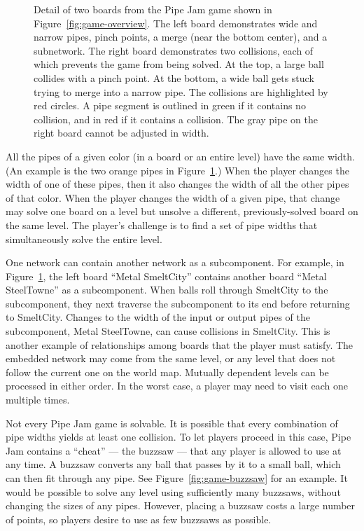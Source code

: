 \documentclass{sig-alternate}
\newcommand{\figref}[1]{Figure~\ref{#1}}
\let\Description =\description
\def\Nospacing{\itemsep=0pt\topsep=0pt\partopsep=0pt\parskip=0pt\parsep=0pt}
\renewenvironment{description}{\Description\Nospacing}{\endlist}
\begin{document}
\begin{description}
\begin{figure}
\caption{
  Detail of two boards from the Pipe Jam game shown in
  \figref{fig:game-overview}.  The left board demonstrates wide and
  narrow pipes, pinch points, a merge (near the bottom center), and a
  subnetwork.  The right board demonstrates two collisions, each of which
  prevents the game from being solved.  At the top, a large ball
  collides with a pinch point.  At the bottom, a wide ball gets stuck
  trying to merge into a narrow pipe.  The collisions are highlighted by
  red circles.  A pipe segment is outlined in green if it contains  no
  collision, and in red if it contains a collision.
  The gray pipe on the right board cannot be adjusted in width.
}
\label{fig:game-detail}
\end{figure}


\item[Linked pipes]
  All the pipes of a given color (in a board or an entire level) have the
  same width.
  (An example is the two orange pipes in \figref{fig:game-detail}.)
  When the player changes the width of one of these pipes,
  then it also changes the width of all the other pipes of that color.
  When the player changes the width of a given pipe, that change may solve
  one board on a level but unsolve a different, previously-solved board on
  the same level.  The player's challenge is to find a set of pipe widths
  that simultaneously solve the entire level.

\item[Embedded networks]
  One network can contain another network as a subcomponent.  For example,
  in \figref{fig:game-detail}, the left board ``Metal SmeltCity''
  contains another board ``Metal SteelTowne'' as a subcomponent.  When
  balls roll through SmeltCity to the subcomponent, they next traverse the
  subcomponent to its end before returning to SmeltCity.  Changes to the
  width of the input or output pipes of the subcomponent, Metal SteelTowne,
  can cause collisions in SmeltCity.  This is another example of
  relationships among boards that the player must satisfy.
  The embedded network may come from the same level, or any level that
  does not follow the current one on the world map.  Mutually dependent
  levels can be processed in either order.  In the worst case, a player
  may need to visit each one multiple times.

\item[Buzzsaws:  Exceptions to the laws of physics]
  Not every Pipe Jam game is solvable.  It is possible that every
  combination of pipe widths yields at least one collision.  To let players
  proceed in this case, Pipe Jam contains a ``cheat'' --- the buzzsaw ---
  that any player is allowed to use at any time.  A buzzsaw converts any
  ball that passes by it to a small ball, which can then fit through any
  pipe.  See \figref{fig:game-buzzsaw} for an example.
  It would be possible to solve any level using sufficiently many buzzsaws,
  without changing the sizes of any pipes.  However, placing a buzzsaw
  costs a large number of points, so players desire to use as few buzzsaws
  as possible.


\end{description}
\end{document}
